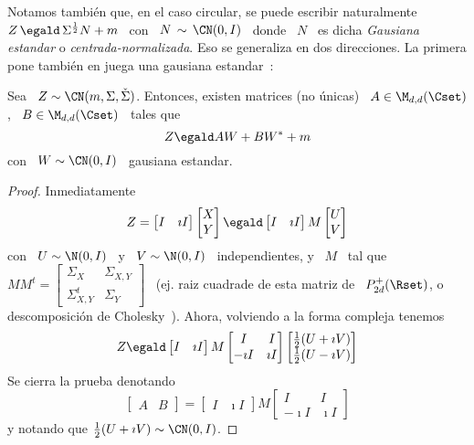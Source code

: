 Notamos tambi\'en que, en el caso  circular, se puede escribir naturalmente \ $Z
\, \egald \, \Sigma^{\frac12} N + m$ \  con \ $N \, \sim \, \CN(0,I)$ \ donde \
$N$ \  es dicha  {\em Gausiana estandar}  o {\em centrada-normalizada}.   Eso se
generaliza en dos direcciones.  La  primera pone tambi\'en en juega una gausiana
estandar~\cite{Lap17}:
%
\begin{teorema}
\label{Teo:MP:GausianaComplejaWWestrella}
%
Sea \  $Z \sim  \CN(m,\Sigma,\check{\Sigma})$.  Entonces, existen  matrices (no
\'unicas) \ $A \in \M_{d,d}(\Cset)$, \ $B \in \M_{d,d}(\Cset)$ \ tales que
  \[
  Z \egald A W + B W^* + m
  \]
  con \ $W \sim \CN(0,I)$ \ gausiana estandar.
\end{teorema}
\begin{proof}
  Inmediatamente
  \[
  Z   =  \begin{bmatrix}   I   &  \imath   I\end{bmatrix}  \begin{bmatrix}   X\\
    Y\end{bmatrix}
  \egald \begin{bmatrix} I & \imath I\end{bmatrix} M \begin{bmatrix} U\\
    V\end{bmatrix}
  \]
  con \ $U \sim \N(0,I)$ \ y \  $V \sim \N(0,I)$ \ independientes, y \ $M$ \ tal
  que  \ $M  M^t =  \begin{bmatrix} \Sigma_X  & \Sigma_{X,Y}  \\  \Sigma_{X,Y}^t &
    \Sigma_Y  \end{bmatrix}$  \   (ej.  raiz  cuadrade  de  esta   matriz  de  \
  $P_{2d}^+(\Rset)$,    o     descomposici\'on    de    Cholesky~\cite{HorJoh13,
    Bha07}). Ahora, volviendo a la forma compleja tenemos
  \[
  Z     \egald   \begin{bmatrix}    I   &   \imath   I\end{bmatrix}
  M \begin{bmatrix} I  & I\\ -\imath I &  \imath I \end{bmatrix} \begin{bmatrix}
    \frac12 (U + \imath V)\\ \frac12 (U - \imath V)\end{bmatrix}
  \]
  Se cierra la prueba denotando
  \[
  \begin{bmatrix}   A   &   B\end{bmatrix}   =  \begin{bmatrix} I &
    \imath  I\end{bmatrix}  M  \begin{bmatrix}  I  &  I\\  -\imath  I  &  \imath
    I \end{bmatrix}
  \]
  y notando que $\frac12 (U + \imath V) \sim \CN(0,I)$.
\end{proof}
